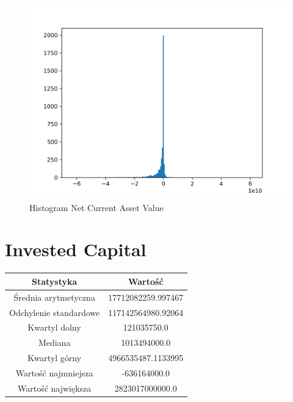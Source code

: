 \documentclass{article}
\begin{document}
\begin{figure}[h!]
    \includegraphics[width=\linewidth]{variables/Net Current Asset Value.png}
    \caption{Histogram Net Current Asset Value }
\end{figure}\section{ Invested Capital }

\begin{center}
    \begin{tabular}{|c | c|} 
    \hline
    Statystyka & Wartość \\
    \hline\hline
    Średnia arytmetyczna & 17712082259.997467 \\ 
    \hline
    Odchylenie standardowe & 117142564980.92064 \\
    \hline
    Kwartyl dolny & 121035750.0 \\
    \hline
    Mediana & 1013494000.0 \\
    \hline
    Kwartyl górny & 4966535487.1133995 \\
    \hline
    Wartość najmniejsza & -636164000.0 \\
    \hline
    Wartość największa & 2823017000000.0 \\
    \hline
   \end{tabular}
\end{center}
\end{document}
